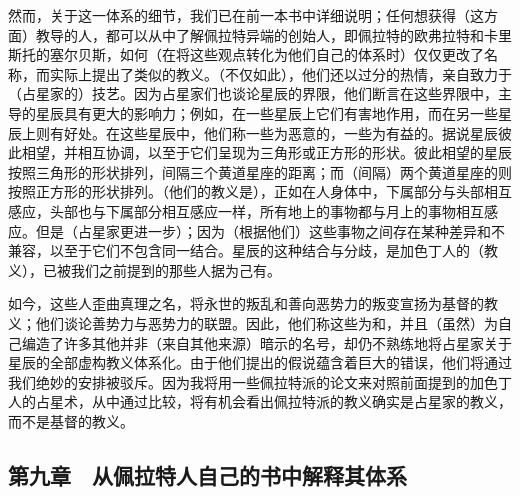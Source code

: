 然而，关于这一体系的细节，我们已在前一本书中详细说明；任何想获得（这方面）教导的人，都可以从中了解佩拉特异端的创始人，即佩拉特的欧弗拉特和卡里斯托的塞尔贝斯，如何（在将这些观点转化为他们自己的体系时）仅仅更改了名称，而实际上提出了类似的教义。（不仅如此），他们还以过分的热情，亲自致力于（占星家的）技艺。因为占星家们也谈论星辰的界限，他们断言在这些界限中，主导的星辰具有更大的影响力；例如，在一些星辰上它们有害地作用，而在另一些星辰上则有好处。在这些星辰中，他们称一些为恶意的，一些为有益的。据说星辰彼此相望，并相互协调，以至于它们呈现为三角形或正方形的形状。彼此相望的星辰按照三角形的形状排列，间隔三个黄道星座的距离；而（间隔）两个黄道星座的则按照正方形的形状排列。（他们的教义是），正如在人身体中，下属部分与头部相互感应，头部也与下属部分相互感应一样，所有地上的事物都与月上的事物相互感应。但是（占星家更进一步）；因为（根据他们）这些事物之间存在某种差异和不兼容，以至于它们不包含同一结合。星辰的这种结合与分歧，是加色丁人的（教义），已被我们之前提到的那些人据为己有。\par

如今，这些人歪曲真理之名，将永世的叛乱和善向恶势力的叛变宣扬为基督的教义；他们谈论善势力与恶势力的联盟。因此，他们称这些为和，并且（虽然）为自己编造了许多其他并非（来自其他来源）暗示的名号，却仍不熟练地将占星家关于星辰的全部虚构教义体系化。由于他们提出的假说蕴含着巨大的错误，他们将通过我们绝妙的安排被驳斥。因为我将用一些佩拉特派的论文来对照前面提到的加色丁人的占星术，从中通过比较，将有机会看出佩拉特派的教义确实是占星家的教义，而不是基督的教义。\par


\subsection{第九章　从佩拉特人自己的书中解释其体系}

